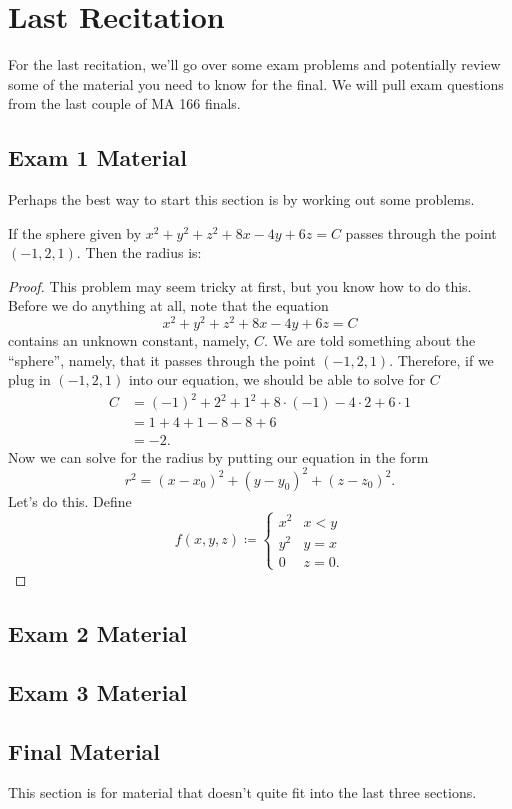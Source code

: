 \chapter{Last Recitation}
For the last recitation, we'll go over some exam problems and potentially
review some of the material you need to know for the final. We will pull
exam questions from the last couple of MA 166 finals.

\section{Exam 1 Material}
Perhaps the best way to start this section is by working out some problems.
\begin{problem}
If the sphere given by $x^2+y^2+z^2+8x-4y+6z=C$ passes through the point
$(-1,2,1)$. Then the radius is:
\end{problem}
\begin{proof}
This problem may seem tricky at first, but you know how to do this. Before
we do anything at all, note that the equation
\[
x^2+y^2+z^2+8x-4y+6z=C
\]
contains an unknown constant, namely, $C$. We are told something about the
``sphere'', namely, that it passes through the point $(-1,2,1)$. Therefore,
if we plug in $(-1,2,1)$ into our equation, we should be able to solve for
$C$
\begin{align*}
C&=(-1)^2+2^2+1^2+8\cdot(-1)-4\cdot 2+6\cdot 1\\
 &=1+4+1-8-8+6\\
 &=-2.
\end{align*}
Now we can solve for the radius by putting our equation in the form
\[
r^2=(x-x_0)^2+(y-y_0)^2+(z-z_0)^2.
\]
Let's do this. Define
\[
f(x,y,z)\coloneqq
\begin{cases}
x^2&x<y\\
y^2&y=x\\
0&z=0.
\end{cases}
\]
\end{proof}


\begin{problem}
\end{problem}

\section{Exam 2 Material}
\section{Exam 3 Material}
\section{Final Material}
This section is for material that doesn't quite fit into the last three
sections.


